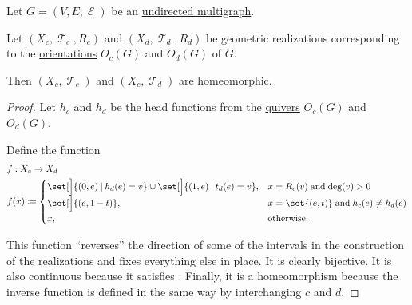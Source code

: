 \begin{proposition}\label{thm:undirected_multigraph_geometric_realizations_homeomorphic}
  Let \( G = (V, E, \mscrE) \) be an \hyperref[def:undirected_multigraph]{undirected multigraph}.

  Let \( (X_c, \mscrT_c, R_c) \) and \( (X_d, \mscrT_d, R_d) \) be geometric realizations corresponding to the \hyperref[def:multigraph_orientation]{orientations} \( O_c(G) \) and \( O_d(G) \) of \( G \).

  Then \( (X_c, \mscrT_c) \) and \( (X_c, \mscrT_d) \) are homeomorphic.
\end{proposition}
\begin{proof}
  Let \( h_c \) and \( h_d \) be the head functions from the \hyperref[def:quiver]{quivers} \( O_c(G) \) and \( O_d(G) \).

  Define the function
  \begin{equation*}
    \begin{aligned}
      &f: X_c \to X_d \\
      &f(x) \coloneqq \begin{cases}
        \set[\Big]{ (0, e) \given h_d(e) = v } \cup \set[\Big]{ (1, e) \given t_d(e) = v }, &x = R_c(v) \T{and} \deg(v) > 0 \\
        \set[\Big]{ (e, 1 - t) },                                                           &x = \set{ (e, t) } \T{and} h_c(e) \neq h_d(e) \\
        x,                                                                                  &\T{otherwise.}
      \end{cases}
    \end{aligned}
  \end{equation*}

  This function \enquote{reverses} the direction of some of the intervals in the construction of the realizations and fixes everything else in place. It is clearly bijective. It is also continuous because it satisfies . Finally, it is a homeomorphism because the inverse function is defined in the same way by interchanging \( c \) and \( d \).
\end{proof}

